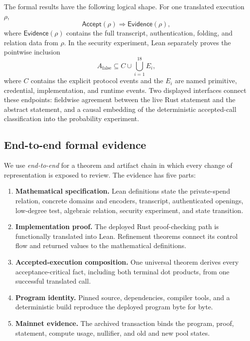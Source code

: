 The formal results have the following logical shape.  For one translated
execution \(\rho\),
\begin{equation}
  \mathsf{Accept}(\rho)
  \Longrightarrow \mathsf{Evidence}(\rho),
  \label{eq:intro-accepted-evidence}
\end{equation}
where \(\mathsf{Evidence}(\rho)\) contains the full transcript,
authentication, folding, and relation data from \(\rho\).  In the security
experiment, Lean separately proves the pointwise inclusion
\begin{equation}
  A_{\mathrm{false}}
  \subseteq C\cup\bigcup_{i=1}^{18}E_i,
  \label{eq:intro-failure-coverage}
\end{equation}
where \(C\) contains the explicit protocol events and the \(E_i\) are named
primitive, credential, implementation, and runtime events.  Two displayed
interfaces connect these endpoints: fieldwise agreement between the live Rust
statement and the abstract statement, and a causal embedding of the
deterministic accepted-call classification into the probability experiment.

\subsection{End-to-end formal evidence}

We use \emph{end-to-end} for a theorem and artifact chain in which every
change of representation is exposed to review.  The evidence has five parts:

\begin{enumerate}[leftmargin=*]
  \item \textbf{Mathematical specification.}  Lean definitions state the
        private-spend relation, concrete domains and encoders, transcript,
        authenticated openings, low-degree test, algebraic relation, security
        experiment, and state transition.
  \item \textbf{Implementation proof.}  The deployed Rust proof-checking path
        is functionally translated into Lean.  Refinement theorems connect its
        control flow and returned values to the mathematical definitions.
  \item \textbf{Accepted-execution composition.}  One universal theorem
        derives every acceptance-critical fact, including both terminal dot
        products, from one successful translated call.
  \item \textbf{Program identity.}  Pinned source, dependencies, compiler
        tools, and a deterministic build reproduce the deployed program byte
        for byte.
  \item \textbf{Mainnet evidence.}  The archived transaction binds the
        program, proof, statement, compute usage, nullifier, and old and new
        pool states.
\end{enumerate}

